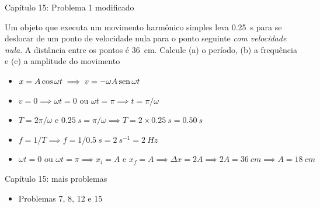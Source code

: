 \begin{frame}{Capítulo 15: Problema 1 modificado}
    \begin{minipage}{\textwidth}
        Um objeto que executa um movimento harmônico simples leva \SI{0.25}{s} para se deslocar de um ponto de
        velocidade nula para o ponto seguinte \textit{com velocidade nula}. A distância entre os pontos é \SI{36}{cm}. Calcule (a) o
        período, (b) a frequência e (c) a amplitude do movimento
    \end{minipage}
    \pause
    \begin{itemize}
    \color{blue}
        \item \(x=A\cos{\omega t} \implies v=-\omega A \operatorname{sen}{\omega t} \)
        \item \(v=0 \implies \omega t = 0 \text{ ou } \omega t = \pi \implies t = \pi /\omega\)
        \item \(T=2\pi / \omega \text{ e } \SI{0.25}{s} = \pi / \omega \implies T=2 \times \SI{0.25}{s} = \SI{0.50}{s}\)
        \item \(f=1/T \implies f=1/\SI{0.5}{s} = \SI{2}{s^{-1}} = \SI{2}{Hz}\)
        \item \(\omega t = 0 \text{ ou } \omega t = \pi \implies x_i=A \text{ e } x_f=A \implies \Delta x = 2A
            \implies 2A= \SI{36}{cm} \implies {A=\SI{18}{cm}}\)
    \end{itemize}
\end{frame}

\begin{frame}{Capítulo 15: mais problemas}
    \begin{itemize}
        \item Problemas 7, 8, 12 e 15
    \end{itemize}
\end{frame}

